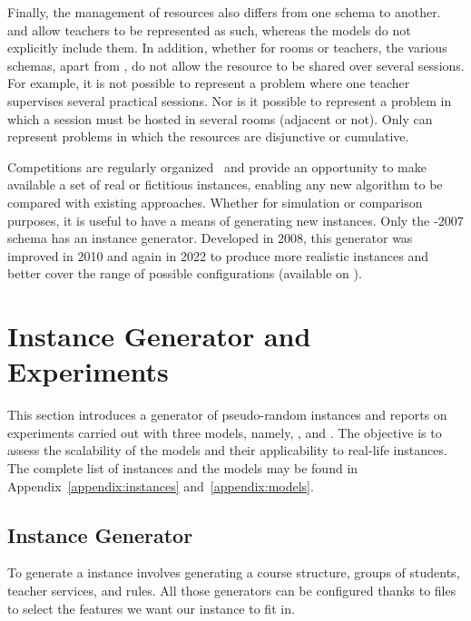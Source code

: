 \documentclass[runningheads]{llncs}
\begin{document}
Finally, the management of resources also differs from one schema to another. \XHSTT{} and \UTP{} allow teachers to be represented as such, whereas the \ITC{} models do not explicitly include them. In addition, whether for rooms or teachers, the various schemas, apart from \UTP{}, do not allow the resource to be shared over several sessions. For example, it is not possible to represent a problem where one teacher supervises several practical sessions. Nor is it possible to represent a problem in which a session must be hosted in several rooms (adjacent or not). Only \UTP{} can represent problems in which the resources are disjunctive or cumulative.



Competitions are regularly organized~\cite{2019_ITC} and provide an opportunity to make available a set of real or fictitious instances, enabling any new algorithm to be compared with existing approaches.
Whether for simulation or comparison purposes, it is useful to have a means of generating new instances.
Only the \ITC{}-2007 schema has an instance generator. Developed in 2008, this generator was improved in 2010 and again in 2022 to produce more realistic instances and better cover the range of possible configurations (available on \cite{2022_dataset}). \section{Instance Generator and Experiments}\label{sec:experiments}


This section introduces a generator of pseudo-random \UTP{} instances
and reports on experiments carried out with three models, namely, \CP{}, \ASP{} and \MIP{}.
The objective is to assess the scalability of the models
and their applicability to real-life instances.
The complete list of instances and the models may be found in Appendix~\ref{appendix:instances} and~\ref{appendix:models}.







\subsection{Instance Generator}

To generate a \UTP{} instance involves generating a course structure,
groups of students, 
teacher services, 
and rules.
All those generators can be configured thanks to \XML{} files to select the features we want our instance to fit in.
\end{document}

